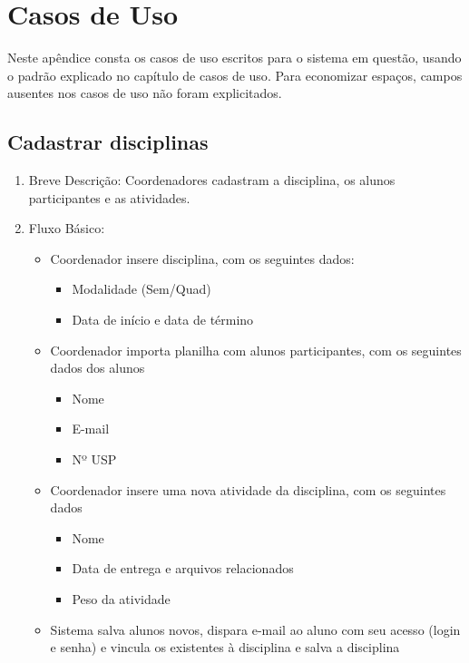 \chapter{Casos de Uso}\label{chap:use-case-appendix}
Neste apêndice consta os casos de uso escritos para o sistema em questão, usando o padrão explicado no capítulo de casos de uso\cite{ibm2011}. Para economizar espaços, campos ausentes nos casos de uso não foram explicitados.

\section{Cadastrar disciplinas}
\begin{enumerate}
    \item Breve Descrição: Coordenadores cadastram a disciplina, os alunos participantes e as atividades.
    \item Fluxo Básico:
        \begin{itemize}
            \item Coordenador insere disciplina, com os seguintes dados:
            \begin{itemize}
                \item Modalidade (Sem/Quad)
                \item Data de início e data de término
            \end{itemize}
            \item Coordenador importa planilha com alunos participantes, com os seguintes dados dos alunos
            \begin{itemize}
                \item Nome
                \item E-mail
                \item Nº USP
            \end{itemize}
            \item Coordenador insere uma nova atividade da disciplina, com os seguintes dados
            \begin{itemize}
                \item Nome
                \item Data de entrega e arquivos relacionados
                \item Peso da atividade
            \end{itemize}
            \item Sistema salva alunos novos, dispara e-mail ao aluno com seu acesso (login e senha) e vincula os existentes à disciplina e salva a disciplina

\end{itemize}
\end{enumerate}
